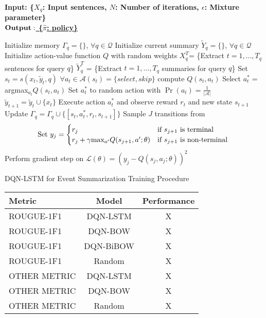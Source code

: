 \documentclass[12pt]{article}
\begin{document}
\begin{algorithm}
    \bf{Input:} { \rm  \{$X_q$: Input sentences, $N$: Number of iterations, $\epsilon$: Mixture parameter\} } \\
    \underline{$\bf{Output: }$ \rm \{$\hat{\pi}$: policy\} }
\begin{algorithmic}[1]
\STATE \rm Initialize memory $\Gamma_q = \{\} $, $\forall q \in \mathcal{Q}$
\STATE \rm Initialize current summary $\tilde{Y}_q = \{\} $, $\forall q \in \mathcal{Q}$
\STATE \rm Initialize action-value function $Q$ with random weights
		\STATE $X^{T}_q$= \{Extract $t=1,...,T_q$ sentences for query $q$\}
		\STATE $\tilde{Y}^{T}_q$ = \{Extract $t=1,...,T_q$ summaries for query $q$\}
			\STATE Set $s_t = s(x_t, \tilde{y}_t, q)$
			\STATE $ \forall a_t \in \mathcal{A}(s_t) = \{select, skip\}$ \textrm{compute} $Q(s_t, a_t)$
			\STATE Select $a^{*}_t =$ argmax$_{a_{t}}Q(s_t, a_t)$
				\STATE  Set $a^{*}_t $ to random action with $\Pr(a_t) =\frac{1}{| \mathcal{A} |} $
			\ENDIF
				\STATE $\tilde{y}_{t+1} = \tilde{y}_t \cup  \{ x_t \} $
			\ENDIF	
			\STATE Execute action $a^{*}_t$ and observe reward $r_t$ and new state $s_{t+1}$
			\STATE Update $\Gamma_q = \Gamma_q \cup \{ [s_t, a^{*}_t, r_t, s_{t+1}]\}$
		\ENDFOR
	\ENDFOR
		\STATE Sample $J$ transitions from
		\STATE \[\textrm{Set } y_j= 
					\begin{cases}
						r_j              								& \text{if $s_{j+1}$ is terminal } \\
					     	r_j + \gamma $max$_{a'}Q(s_{j+1}, a'; \theta) 	& \text{if $s_{j+1}$ is non-terminal } 
					\end{cases} 
					\]
        		\STATE Perform gradient step on $\mathcal{L}(\theta) = (y_j - Q(s_j, a_j; \theta))^2$
		\ENDFOR
\ENDFOR
  \end{algorithmic}
    \caption{DQN-LSTM for Event Summarization Training Procedure}
\end{algorithm}


\begin{tabular}{ l | c | c  }
	\hline
	Metric  & Model  & Performance\\ \hline \hline
  	ROUGUE-1F1 & DQN-LSTM  & X \\
  	ROUGUE-1F1 & DQN-BOW  & X \\
  	ROUGUE-1F1 & DQN-BiBOW  & X \\
  	ROUGUE-1F1 & Random  & X \\ \hline
  	OTHER METRIC & DQN-LSTM  & X \\
  	OTHER METRIC & DQN-BOW  & X \\
  	OTHER METRIC & Random  & X \\ \hline
	\hline
\end{tabular}



\newpage


\end{document}
